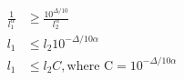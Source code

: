 $$
\begin{align*}
\frac{1}{l_1^\alpha} &\geq \frac{10^{\Delta/10}}{l_2^{\alpha}} \\
l_1 &\leq l_2 10^{-\Delta/10\alpha} \\
l_1 &\leq l_2 C, \text{where C} = 10^{-\Delta/10\alpha}
\end{align*}
$$
